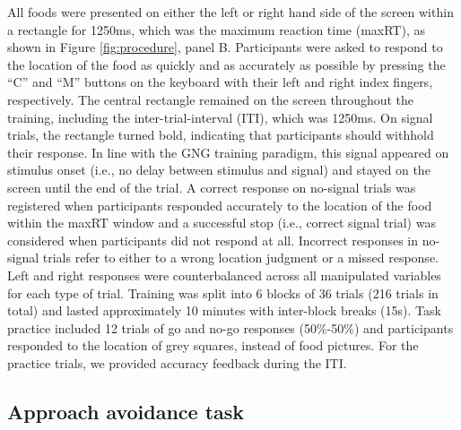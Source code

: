 \documentclass[man,floatsintext]{apa6}
\begin{document}
All foods were presented on either the left or right hand side of the
screen within a rectangle for 1250ms, which was the maximum reaction
time (maxRT), as shown in Figure \ref{fig:procedure}, panel B.
Participants were asked to respond to the location of the food as
quickly and as accurately as possible by pressing the \enquote{C} and
\enquote{M} buttons on the keyboard with their left and right index
fingers, respectively. The central rectangle remained on the screen
throughout the training, including the inter-trial-interval (ITI), which
was 1250ms. On signal trials, the rectangle turned bold, indicating that
participants should withhold their response. In line with the GNG
training paradigm, this signal appeared on stimulus onset (i.e., no
delay between stimulus and signal) and stayed on the screen until the
end of the trial. A correct response on no-signal trials was registered
when participants responded accurately to the location of the food
within the maxRT window and a successful stop (i.e., correct signal
trial) was considered when participants did not respond at all.
Incorrect responses in no-signal trials refer to either to a wrong
location judgment or a missed response. Left and right responses were
counterbalanced across all manipulated variables for each type of trial.
Training was split into 6 blocks of 36 trials (216 trials in total) and
lasted approximately 10 minutes with inter-block breaks (15s). Task
practice included 12 trials of go and no-go responses (50\%-50\%) and
participants responded to the location of grey squares, instead of food
pictures. For the practice trials, we provided accuracy feedback during
the ITI.

\subsection{Approach avoidance task}\label{aat}

\par
\end{document}
